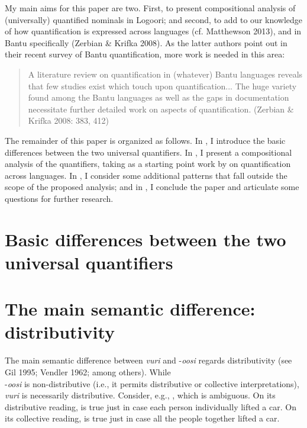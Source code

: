 \documentclass[output=paper]{langsci/langscibook}
\begin{document}
  My main aims for this paper are two. First, to present compositional analysis of (universally) quantified nominals in Logoori; and second, to add to our knowledge of how quantification is expressed across languages (cf. Matthewson 2013), and in Bantu specifically (Zerbian \& Krifka 2008). As the latter authors point out in their recent survey of Bantu quantification, more work is needed in this area:

\begin{quote}
A literature review on quantification in (whatever) Bantu languages reveals that few studies exist which touch upon quantification... The huge variety found among the Bantu languages as well as the gaps in documentation necessitate further detailed work on aspects of quantification. (Zerbian \& Krifka 2008: 383, 412) 
\end{quote}

  The remainder of this paper is organized as follows. In , I introduce the basic differences between the two universal quantifiers. In , I present a compositional analysis of the quantifiers, taking as a starting point work by \citet{Matthewson2013} on quantification across languages. In , I consider some additional patterns that fall outside the scope of the proposed analysis; and in , I conclude the paper and articulate some questions for further research.

\section{Basic differences between the two universal quantifiers}

\section{The main semantic difference: distributivity} 

The main semantic difference between \textit{vuri} and -\textit{oosi} regards distributivity (see Gil 1995; Vendler 1962; among others). While \\
{}-\textit{oosi} is non-distributive (i.e., it permits distributive or collective interpretations), \textit{vuri} is necessarily distributive. Consider, e.g., , which is ambiguous. On its distributive reading,  is true just in case each person individually lifted a car. On its collective reading,  is true just in case all the people together lifted a car.
\end{document}
